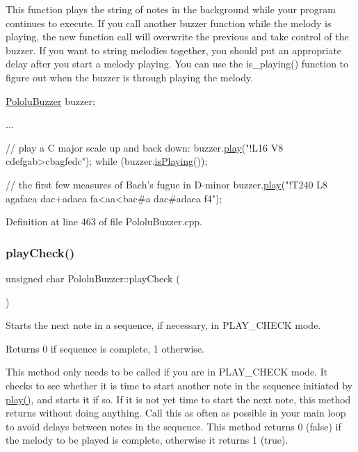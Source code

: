 This function plays the string of notes in the background while your program continues to execute. If you call another buzzer function while the melody is playing, the new function call will overwrite the previous and take control of the buzzer. If you want to string melodies together, you should put an appropriate delay after you start a melody playing. You can use the {\ttfamily is\+\_\+playing()} function to figure out when the buzzer is through playing the melody.


\begin{DoxyCode}
\hyperlink{class_pololu_buzzer}{PololuBuzzer} buzzer;

...

\textcolor{comment}{// play a C major scale up and back down:}
buzzer.\hyperlink{class_pololu_buzzer_a22f45ef7cdf9dc8fc54e617244368277}{play}(\textcolor{stringliteral}{"!L16 V8 cdefgab>cbagfedc"});
\textcolor{keywordflow}{while} (buzzer.\hyperlink{class_pololu_buzzer_a8045fdf0a144e0b71a5b223a0ef34027}{isPlaying}());

\textcolor{comment}{// the first few measures of Bach's fugue in D-minor}
buzzer.\hyperlink{class_pololu_buzzer_a22f45ef7cdf9dc8fc54e617244368277}{play}(\textcolor{stringliteral}{"!T240 L8 agafaea dac+adaea fa<aa<bac#a dac#adaea f4"});
\end{DoxyCode}
 

Definition at line 463 of file Pololu\+Buzzer.\+cpp.

\mbox{\label{class_pololu_buzzer_a427225dcc85c1e65078e4397b9890929}} 
\subsubsection{\texorpdfstring{play\+Check()}{playCheck()}}
{\footnotesize\ttfamily unsigned char Pololu\+Buzzer\+::play\+Check (\begin{DoxyParamCaption}{ }\end{DoxyParamCaption})\hspace{0.3cm}{\ttfamily [static]}}



Starts the next note in a sequence, if necessary, in {\ttfamily P\+L\+A\+Y\+\_\+\+C\+H\+E\+CK} mode. 

\begin{DoxyReturn}{Returns}
0 if sequence is complete, 1 otherwise.
\end{DoxyReturn}
This method only needs to be called if you are in {\ttfamily P\+L\+A\+Y\+\_\+\+C\+H\+E\+CK} mode. It checks to see whether it is time to start another note in the sequence initiated by {\ttfamily \hyperlink{class_pololu_buzzer_a22f45ef7cdf9dc8fc54e617244368277}{play()}}, and starts it if so. If it is not yet time to start the next note, this method returns without doing anything. Call this as often as possible in your main loop to avoid delays between notes in the sequence. This method returns 0 (false) if the melody to be played is complete, otherwise it returns 1 (true). 

